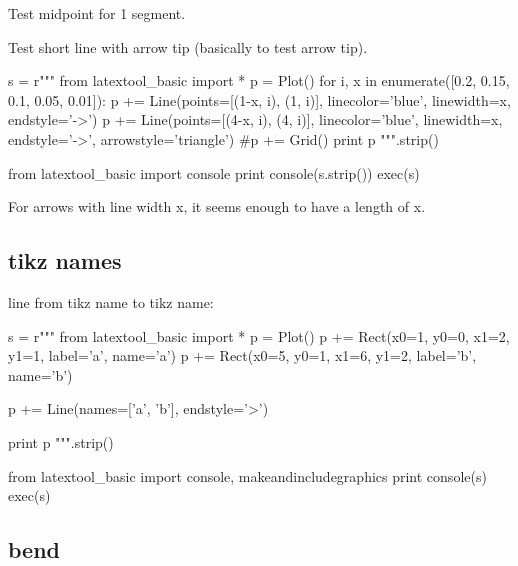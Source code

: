\newpage

Test midpoint for 1 segment.


\newpage
Test short line with arrow tip (basically to test arrow tip).
\begin{python}
s = r"""
from latextool_basic import *
p = Plot()
for i, x in enumerate([0.2, 0.15, 0.1, 0.05, 0.01]):
    p += Line(points=[(1-x, i), (1, i)], linecolor='blue', linewidth=x, 
              endstyle='->')    
    p += Line(points=[(4-x, i), (4, i)], linecolor='blue', linewidth=x, 
              endstyle='->', arrowstyle='triangle')    
#p += Grid()
print p
""".strip()

from latextool_basic import console
print console(s.strip())
exec(s)
\end{python}

For arrows with line width x, it seems enough to have a length of x.



\newpage
\subsection{tikz names}
line from tikz name to tikz name:

\begin{python}
s = r"""
from latextool_basic import *
p = Plot()
p += Rect(x0=1, y0=0, x1=2, y1=1, label='a', name='a')
p += Rect(x0=5, y0=1, x1=6, y1=2, label='b', name='b')

p += Line(names=['a', 'b'], endstyle='>')

print p
""".strip()

from latextool_basic import console, makeandincludegraphics
print console(s)
exec(s)
\end{python}



\newpage
\subsection{bend}

